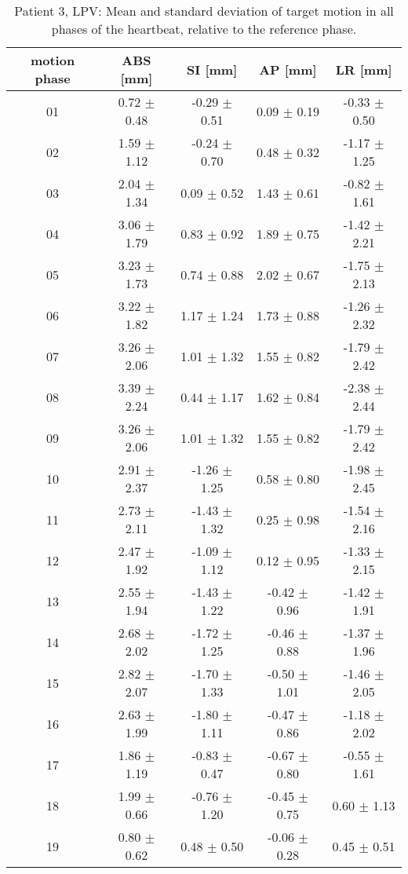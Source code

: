 \begin{table}[htbp]
  \centering
    \tiny
  \caption{Patient 3, LPV: Mean and standard deviation of target motion in all phases of the heartbeat, relative to the reference phase.}
  \begin{tabular}{|c|c|c|c|c|}
    \hline\hline
    motion phase\rule{0pt}{2.6ex}\rule[-1.2ex]{0pt}{0pt} & ABS [mm] & SI [mm] & AP [mm] & LR [mm]\\
    \hline
01& 0.72 $\pm$ 0.48& -0.29 $\pm$ 0.51& 0.09 $\pm$ 0.19& -0.33 $\pm$ 0.50 \\
02& 1.59 $\pm$ 1.12& -0.24 $\pm$ 0.70& 0.48 $\pm$ 0.32& -1.17 $\pm$ 1.25 \\
03& 2.04 $\pm$ 1.34& 0.09 $\pm$ 0.52& 1.43 $\pm$ 0.61& -0.82 $\pm$ 1.61 \\
04& 3.06 $\pm$ 1.79& 0.83 $\pm$ 0.92& 1.89 $\pm$ 0.75& -1.42 $\pm$ 2.21 \\
05& 3.23 $\pm$ 1.73& 0.74 $\pm$ 0.88& 2.02 $\pm$ 0.67& -1.75 $\pm$ 2.13 \\
06& 3.22 $\pm$ 1.82& 1.17 $\pm$ 1.24& 1.73 $\pm$ 0.88& -1.26 $\pm$ 2.32 \\
07& 3.26 $\pm$ 2.06& 1.01 $\pm$ 1.32& 1.55 $\pm$ 0.82& -1.79 $\pm$ 2.42 \\
08& 3.39 $\pm$ 2.24& 0.44 $\pm$ 1.17& 1.62 $\pm$ 0.84& -2.38 $\pm$ 2.44 \\
09& 3.26 $\pm$ 2.06& 1.01 $\pm$ 1.32& 1.55 $\pm$ 0.82& -1.79 $\pm$ 2.42 \\
10& 2.91 $\pm$ 2.37& -1.26 $\pm$ 1.25& 0.58 $\pm$ 0.80& -1.98 $\pm$ 2.45 \\
11& 2.73 $\pm$ 2.11& -1.43 $\pm$ 1.32& 0.25 $\pm$ 0.98& -1.54 $\pm$ 2.16 \\
12& 2.47 $\pm$ 1.92& -1.09 $\pm$ 1.12& 0.12 $\pm$ 0.95& -1.33 $\pm$ 2.15 \\
13& 2.55 $\pm$ 1.94& -1.43 $\pm$ 1.22& -0.42 $\pm$ 0.96& -1.42 $\pm$ 1.91 \\ 
14& 2.68 $\pm$ 2.02& -1.72 $\pm$ 1.25& -0.46 $\pm$ 0.88& -1.37 $\pm$ 1.96 \\
15& 2.82 $\pm$ 2.07& -1.70 $\pm$ 1.33& -0.50 $\pm$ 1.01& -1.46 $\pm$ 2.05 \\ 
16& 2.63 $\pm$ 1.99& -1.80 $\pm$ 1.11& -0.47 $\pm$ 0.86& -1.18 $\pm$ 2.02 \\ 
17& 1.86 $\pm$ 1.19& -0.83 $\pm$ 0.47& -0.67 $\pm$ 0.80& -0.55 $\pm$ 1.61 \\
18& 1.99 $\pm$ 0.66& -0.76 $\pm$ 1.20& -0.45 $\pm$ 0.75& 0.60 $\pm$ 1.13 \\
19& 0.80 $\pm$ 0.62& 0.48 $\pm$ 0.50& -0.06 $\pm$ 0.28& 0.45 $\pm$ 0.51 \\
    \hline\hline
  \end{tabular}
\end{table}

